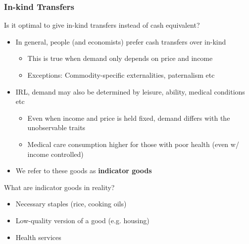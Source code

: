 \documentclass[aspectratio=169]{beamer}
\begin{document}
\begin{frame}
\frametitle{In-kind Transfers} 
Is it optimal to give in-kind transfers instead of cash equivalent?
\begin{itemize}\setlength\itemsep{3pt}
\item In general, people (and economists) prefer cash transfers over in-kind
\begin{itemize}\setlength\itemsep{3pt}
\item This is true when demand only depends on price and income
\item Exceptions: Commodity-specific externalities, paternalism etc
\end{itemize}
\item IRL, demand may also be determined by leisure, ability, medical conditions etc
\begin{itemize}\setlength\itemsep{3pt}
\item Even when income and price is held fixed, demand differs with the unobservable traits
\item Medical care consumption higher for those with poor health (even w/ income controlled)
\end{itemize}
\item We refer to these goods as \textbf{indicator goods}
\end{itemize}\medskip
What are indicator goods in reality?
\begin{itemize}\setlength\itemsep{3pt}
\item Necessary staples (rice, cooking oils)
\item Low-quality version of a good (e.g. housing)
\item Health services 
\end{itemize}
\end{frame}
\end{document}
